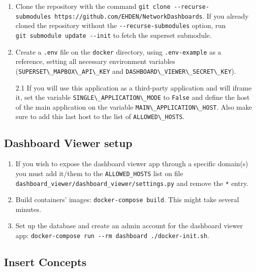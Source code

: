 \documentclass[
]{book}
\begin{document}
\begin{enumerate}
\def\labelenumi{\arabic{enumi}.}
\item
  Clone the repository with the command \texttt{git\ clone\ -\/-recurse-submodules\ https://github.com/EHDEN/NetworkDashboards}. If you already cloned the repository without the \texttt{-\/-recurse-submodules} option, run \texttt{git\ submodule\ update\ -\/-init} to fetch the superset submodule.
\item
  Create a \texttt{.env} file on the \texttt{docker} directory, using \texttt{.env-example} as a reference, setting all necessary environment variables (\texttt{SUPERSET\textbackslash{}\_MAPBOX\textbackslash{}\_API\textbackslash{}\_KEY} and \texttt{DASHBOARD\textbackslash{}\_VIEWER\textbackslash{}\_SECRET\textbackslash{}\_KEY}).

  2.1 If you will use this application as a third-party application and will iframe it, set the variable \texttt{SINGLE\textbackslash{}\_APPLICATION\textbackslash{}\_MODE} to \texttt{False} and define the host of the main application on the variable \texttt{MAIN\textbackslash{}\_APPLICATION\textbackslash{}\_HOST}. Also make sure to add this last host to the list of \texttt{ALLOWED\textbackslash{}\_HOSTS}.
\end{enumerate}

\hypertarget{dashboard-viewer-setup}{%
\subsection*{Dashboard Viewer setup}\label{dashboard-viewer-setup}}

\begin{enumerate}
\def\labelenumi{\arabic{enumi}.}
\item
  If you wish to expose the dashboard viewer app through a specific domain(s) you must add it/them to the \texttt{ALLOWED\_HOSTS} list on file \texttt{dashboard\_viewer/dashboard\_viewer/settings.py} and remove the \texttt{\textquotesingle{}*\textquotesingle{}} entry.
\item
  Build containers' images: \texttt{docker-compose\ build}. This might take several minutes.
\item
  Set up the database and create an admin account for the dashboard viewer app: \texttt{docker-compose\ run\ -\/-rm\ dashboard\ ./docker-init.sh}.
\end{enumerate}

\hypertarget{insert-concepts}{%
\subsection*{Insert Concepts}\label{insert-concepts}}
\end{document}
